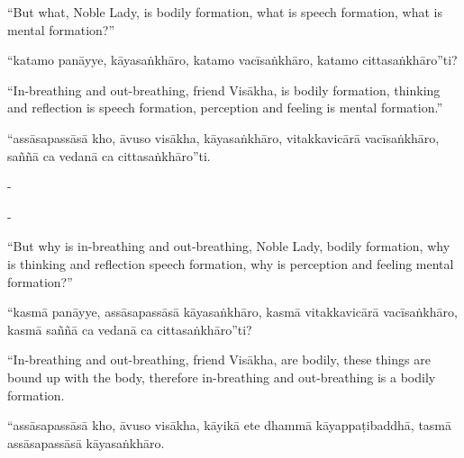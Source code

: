 \begin{samepage}
\begin{leftcolumn*}
“But what, Noble Lady, is bodily formation, what is speech formation, what is mental formation?”
\end{leftcolumn*}

\begin{rightcolumn}
“katamo panāyye, kāyasaṅkhāro, katamo vacīsaṅkhāro, katamo cittasaṅkhāro”ti?
\end{rightcolumn}
\end{samepage}

\begin{samepage}
\begin{leftcolumn*}
“In-breathing and out-breathing, friend Visākha, is bodily formation, thinking and reflection is speech formation, perception and feeling is mental formation.”
\end{leftcolumn*}

\begin{rightcolumn}
“assāsapassāsā kho, āvuso visākha, kāyasaṅkhāro, vitakkavicārā vacīsaṅkhāro, saññā ca vedanā ca cittasaṅkhāro”ti.
\end{rightcolumn}
\end{samepage}

\begin{samepage}
\begin{leftcolumn*}
-
\end{leftcolumn*}

\begin{rightcolumn}
-
\end{rightcolumn}
\end{samepage}

\begin{samepage}
\begin{leftcolumn*}
“But why is in-breathing and out-breathing, Noble Lady, bodily formation, why is thinking and reflection speech formation, why is perception and feeling mental formation?”
\end{leftcolumn*}

\begin{rightcolumn}
“kasmā panāyye, assāsapassāsā kāyasaṅkhāro, kasmā vitakkavicārā vacīsaṅkhāro, kasmā saññā ca vedanā ca cittasaṅkhāro”ti?
\end{rightcolumn}
\end{samepage}

\begin{samepage}
\begin{leftcolumn*}
“In-breathing and out-breathing, friend Visākha, are bodily, these things are bound up with the body, therefore in-breathing and out-breathing is a bodily formation.
\end{leftcolumn*}

\begin{rightcolumn}
“assāsapassāsā kho, āvuso visākha, kāyikā ete dhammā kāyappaṭibaddhā, tasmā assāsapassāsā kāyasaṅkhāro.
\end{rightcolumn}
\end{samepage}

